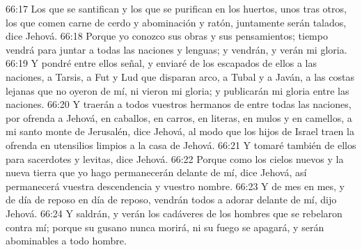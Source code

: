 66:17 Los que se santifican y los que se purifican en los huertos, unos tras otros, los que comen carne de cerdo y abominación y ratón, juntamente serán talados, dice Jehová. 
66:18 Porque yo conozco sus obras y sus pensamientos; tiempo vendrá para juntar a todas las naciones y lenguas; y vendrán, y verán mi gloria. 
66:19 Y pondré entre ellos señal, y enviaré de los escapados de ellos a las naciones, a Tarsis, a Fut y Lud que disparan arco, a Tubal y a Javán, a las costas lejanas que no oyeron de mí, ni vieron mi gloria; y publicarán mi gloria entre las naciones. 
66:20 Y traerán a todos vuestros hermanos de entre todas las naciones, por ofrenda a Jehová, en caballos, en carros, en literas, en mulos y en camellos, a mi santo monte de Jerusalén, dice Jehová, al modo que los hijos de Israel traen la ofrenda en utensilios limpios a la casa de Jehová. 
66:21 Y tomaré también de ellos para sacerdotes y levitas, dice Jehová. 
66:22 Porque como los cielos nuevos y la nueva tierra que yo hago permanecerán delante de mí, dice Jehová, así permanecerá vuestra descendencia y vuestro nombre. 
66:23 Y de mes en mes, y de día de reposo en día de reposo, vendrán todos a adorar delante de mí, dijo Jehová. 
66:24 Y saldrán, y verán los cadáveres de los hombres que se rebelaron contra mí; porque su gusano nunca morirá, ni su fuego se apagará, y serán abominables a todo hombre. 
